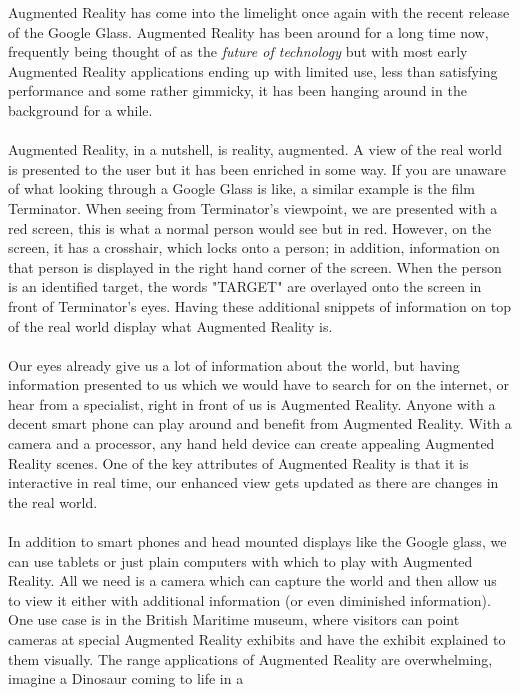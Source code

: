 \documentclass[11pt]{article}
\begin{document}
Augmented Reality has come into the limelight once
again with the recent release of the Google Glass. Augmented Reality has 
been around for a long time now, frequently being
thought of as the \textit{future of technology} but with most
early Augmented Reality applications ending up with limited use, 
less than satisfying performance and some rather
gimmicky, it has been hanging around in the background for a while.
\\ \\
Augmented Reality, in a nutshell, is reality, augmented. A view of the 
real world is presented
to the user but it has been enriched in some way. If you are unaware
of what looking through a Google Glass is like, a similar example 
is the film Terminator. When seeing from Terminator's viewpoint, we are 
presented with a red screen, this is what a normal person would see but in red.
However, on the screen, it has a crosshair, which locks onto a person; in 
addition, information on that person is displayed in the right hand corner
of the screen.
When the person is an identified target, the words "TARGET" are 
overlayed onto the screen in front of Terminator's eyes. 
Having these additional snippets of information on top of the real
world display what Augmented Reality is.\\
\\
Our eyes already give us a lot of information about 
the world, but having information presented to us which we would have to 
search for on the internet, or hear from a specialist, right in front of
us is Augmented Reality. Anyone with a decent smart
phone can play around and benefit from Augmented Reality. 
With a camera and a processor, any hand held device can create
appealing Augmented Reality scenes. One of the key attributes of 
Augmented Reality is that it is interactive in real time, our enhanced 
view gets updated as there are changes in the real world. \\ 
\\
In addition to smart phones and head mounted displays like the Google glass,
we can use tablets or just plain computers with which to play
with Augmented Reality. All we need is a camera which can capture the world and then allow 
us to view it either with additional information (or even diminished 
information). One use case is in the British Maritime museum, where 
visitors can point cameras at special Augmented Reality exhibits 
and have the exhibit explained to them visually. The range applications 
of Augmented Reality are overwhelming, imagine a Dinosaur coming to life in a
\end{document}
